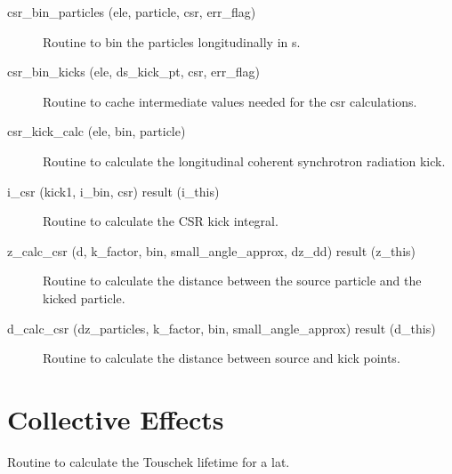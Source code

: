 \begin{description}

\label{r:csr.bin.particles}
\item[csr_bin_particles (ele, particle, csr, err_flag)] \Newline 
Routine to bin the particles longitudinally in s. 

\label{r:csr.bin.kicks}
\item[csr_bin_kicks (ele, ds_kick_pt, csr, err_flag)] \Newline 
Routine to cache intermediate values needed for the csr calculations.

\label{r:csr.kick.calc}
\item[csr_kick_calc (ele, bin, particle)] \Newline 
Routine to calculate the longitudinal coherent synchrotron radiation kick.

\label{r:i.csr}
\item[i_csr (kick1, i_bin, csr) result (i_this)] \Newline 
Routine to calculate the CSR kick integral.

\label{r:z.calc.csr}
\item[z_calc_csr (d, k_factor, bin, small_angle_approx, dz_dd) result (z_this)] \Newline 
Routine to calculate the distance between the source particle and the
kicked particle.

\label{r:d.calc.csr}
\item[d_calc_csr (dz_particles, k_factor, bin, small_angle_approx) result (d_this)] \Newline 
Routine to calculate the distance between source and kick points.

\end{description}

\section{Collective Effects}
\label{r:collective}

\begin{description}

\label{r:touschek.lifetime}
\item[touschek_lifetime (mode, Tl, lat)] \Newline
Routine to calculate the Touschek lifetime for a lat.

\end{description}

